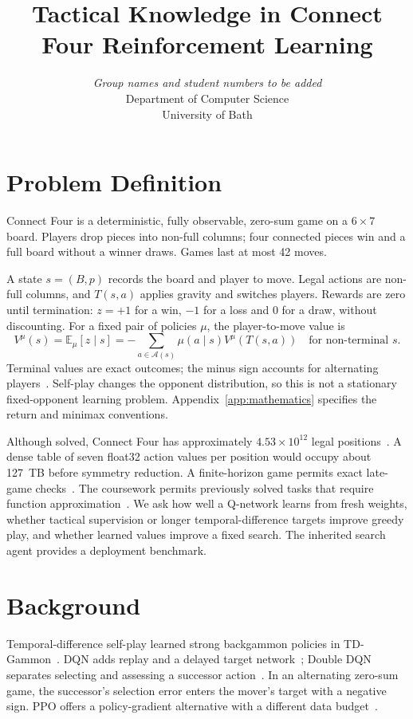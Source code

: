\documentclass[letterpaper]{article}
\title{Tactical Knowledge in Connect Four Reinforcement Learning}
\author{\textit{Group names and student numbers to be added}\\
Department of Computer Science\\
University of Bath}
\begin{document}
\maketitle

\section{Problem Definition}
Connect Four is a deterministic, fully observable, zero-sum game on a $6\times7$
board. Players drop pieces into non-full columns; four connected pieces win and
a full board without a winner draws. Games last at most 42 moves.

A state $s=(B,p)$ records the board and player to move. Legal actions are non-full
columns, and $T(s,a)$ applies gravity and switches players. Rewards are zero
until termination: $z=+1$ for a win, $-1$ for a loss and $0$ for a draw, without
discounting. For a fixed pair of policies $\mu$, the player-to-move value is
\begin{equation}
 V^\mu(s)=\mathbb E_\mu[z\mid s]
 =-\sum_{a\in\mathcal A(s)}\mu(a\mid s)V^\mu(T(s,a))
 \quad\text{for non-terminal }s.
 \label{eq:bellman}
\end{equation}
Terminal values are exact outcomes; the minus sign accounts for alternating
players~\cite{sutton2018}. Self-play changes the opponent distribution, so this
is not a stationary fixed-opponent learning problem.
Appendix~\ref{app:mathematics} specifies the return and minimax conventions.

Although solved, Connect Four has approximately $4.53\times10^{12}$ legal
positions~\cite{tromp}. A dense table of seven float32 action values per position would occupy about 127~TB before symmetry reduction.
A finite-horizon game permits exact late-game checks~\cite{allis1988}. The coursework permits previously solved tasks that require function approximation~\cite{brief}.
We ask how well a Q-network learns from fresh weights, whether tactical
supervision or longer temporal-difference targets improve greedy play,
and whether learned values improve a fixed search. The inherited search
agent provides a deployment benchmark.

\section{Background}
Temporal-difference self-play learned strong backgammon policies in
TD-Gammon~\cite{tesauro1995}. DQN adds replay and a delayed target
network~\cite{mnih2015}; Double DQN separates selecting and assessing a
successor action~\cite{vanhasselt2016}. In an alternating zero-sum game, the
successor's selection error enters the mover's target with a negative sign.
PPO offers a policy-gradient alternative with a different data
budget~\cite{schulman2017}.
\end{document}
